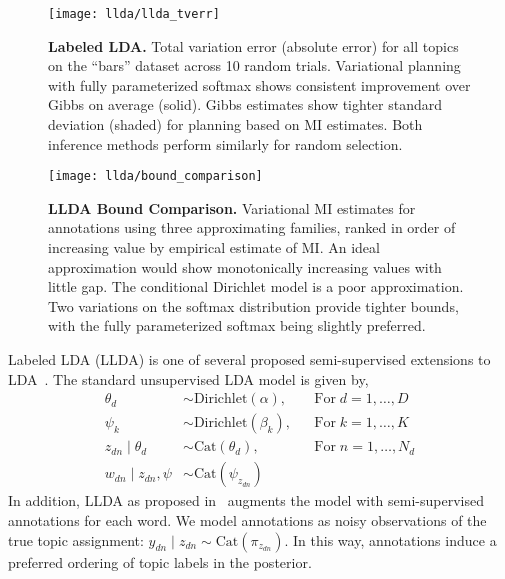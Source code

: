 \begin{figure}
  \centering
  \texttt{[image: llda/llda\_tverr]} \vspace{-2mm}
  
  \caption{\small\textbf{Labeled LDA.} Total variation error (absolute
  error) for all topics on the ``bars'' dataset across 10 random
  trials.  Variational planning with fully parameterized softmax shows
  consistent improvement over Gibbs on average (solid).  Gibbs
  estimates show tighter standard deviation (shaded) for planning
  based on MI estimates.  Both inference methods perform similarly
  for random selection.}
  
  \label{fig:llda_tv}
\end{figure}

\begin{figure}
  \centering
  \texttt{[image: llda/bound\_comparison]}
  
  \caption{\small\textbf{LLDA Bound Comparison.} Variational MI
  estimates for annotations using three approximating families, ranked
  in order of increasing value by empirical estimate of MI.  An ideal
  approximation would show monotonically increasing values with little
  gap.  The conditional Dirichlet model is a poor approximation.  Two
  variations on the softmax distribution provide tighter bounds, with
  the fully parameterized softmax being slightly
  preferred.}  \label{fig:llda_bound}
\end{figure}

Labeled LDA (LLDA) is one of several proposed semi-supervised
extensions to LDA~\citep{blei2003latent}.  The standard unsupervised
LDA model is given by,
\begin{align*}
  \theta_d &\sim \text{Dirichlet}(\alpha), &&\text{For}\; d=1,\ldots,D \\
  \psi_k &\sim \text{Dirichlet}(\beta_k), &&\text{For}\; k=1,\ldots,K \\
  z_{dn} \mid \theta_d &\sim \text{Cat}(\theta_d), &&\text{For}\;
    n=1,\ldots,N_d \\
  w_{dn} \mid z_{dn}, \psi &\sim \text{Cat}(\psi_{z_{dn}}) &&
\end{align*}
In addition, LLDA as proposed in~\cite{flaherty2005latent} augments
the model with semi-supervised annotations for each word.  We model
annotations as noisy observations of the true topic assignment:
$y_{dn} \mid z_{dn} \sim \text{Cat}(\pi_{z_{dn}})$.  In this way,
annotations induce a preferred ordering of topic labels in the posterior.

